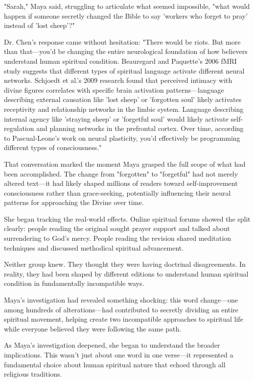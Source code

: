 \documentclass[12pt,twoside]{book}
\begin{document}
"Sarah," Maya said, struggling to articulate what seemed impossible, "what would happen if someone secretly changed the Bible to say 'workers who forget to pray' instead of 'lost sheep'?"

Dr. Chen's response came without hesitation: "There would be riots. But more than that—you'd be changing the entire neurological foundation of how believers understand human spiritual condition. Beauregard and Paquette's 2006 fMRI study suggests that different types of spiritual language activate different neural networks. Schjoedt et al.'s 2009 research found that perceived intimacy with divine figures correlates with specific brain activation patterns—language describing external causation like 'lost sheep' or 'forgotten soul' likely activates receptivity and relationship networks in the limbic system. Language describing internal agency like 'straying sheep' or 'forgetful soul' would likely activate self-regulation and planning networks in the prefrontal cortex. Over time, according to Pascual-Leone's work on neural plasticity, you'd effectively be programming different types of consciousness."

That conversation marked the moment Maya grasped the full scope of what had been accomplished. The change from "forgotten" to "forgetful" had not merely altered text—it had likely shaped millions of readers toward self-improvement consciousness rather than grace-seeking, potentially influencing their neural patterns for approaching the Divine over time.

She began tracking the real-world effects. Online spiritual forums showed the split clearly: people reading the original sought prayer support and talked about surrendering to God's mercy. People reading the revision shared meditation techniques and discussed methodical spiritual advancement.

Neither group knew. They thought they were having doctrinal disagreements. In reality, they had been shaped by different editions to understand human spiritual condition in fundamentally incompatible ways.

Maya's investigation had revealed something shocking: this word change—one among hundreds of alterations—had contributed to secretly dividing an entire spiritual movement, helping create two incompatible approaches to spiritual life while everyone believed they were following the same path.

As Maya's investigation deepened, she began to understand the broader implications. This wasn't just about one word in one verse—it represented a fundamental choice about human spiritual nature that echoed through all religious traditions.
\end{document}
